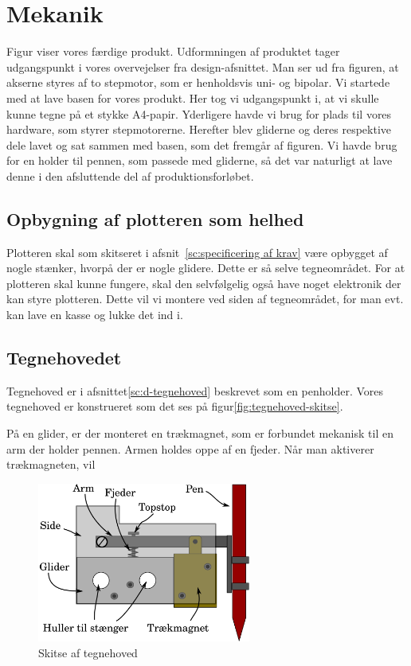 \chapter[Implementering af mekanik]{Mekanik}


Figur  viser vores færdige
produkt.  Udformningen af produktet tager udgangspunkt i vores
overvejelser fra design-afsnittet.  Man ser ud fra figuren, at akserne
styres af to stepmotor, som er henholdsvis uni- og bipolar.  Vi
startede med at lave basen for vores produkt. Her tog vi udgangspunkt
i, at vi skulle kunne tegne på et stykke A4-papir. Yderligere havde vi
brug for plads til vores hardware, som styrer stepmotorerne. Herefter
blev gliderne og deres respektive dele lavet og sat sammen med basen,
som det fremgår af figuren. Vi havde brug for en holder til pennen,
som passede med gliderne, så det var naturligt at lave denne i den
afsluttende del af produktionsforløbet.

\section{Opbygning af plotteren som helhed}
Plotteren skal som skitseret i afsnit~\vref{sc:specificering af krav}
være opbygget af nogle stænker, hvorpå der er nogle glidere. Dette er
så selve tegneområdet. For at plotteren skal kunne fungere, skal den
selvfølgelig også have noget elektronik der kan styre plotteren. Dette
vil vi montere ved siden af tegneområdet, for man evt. kan lave en
kasse og lukke det ind i.


\section{Tegnehovedet}
\label{sc:i-tegnehovedet}
Tegnehoved er i afsnittet\vref{sc:d-tegnehoved} beskrevet som en
penholder. Vores tegnehoved er konstrueret som det ses på
figur\vref{fig:tegnehoved-skitse}.

På en glider, er der monteret en trækmagnet, som er forbundet mekanisk
til en arm der holder pennen. Armen holdes oppe af en fjeder. Når man
aktiverer trækmagneten, vil

\begin{figure}[htbp]
  \centering
  \includegraphics[width=7cm]{./img/tegnehoved-skitse}
  \caption{Skitse af tegnehoved}
  \label{fig:tegnehoved-skitse}
\end{figure}

